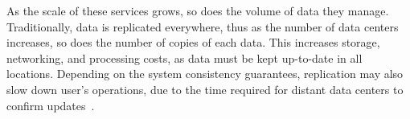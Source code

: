 
As the scale of these services grows, so does the volume of data they manage.
Traditionally, data is replicated everywhere, thus as the number of data centers increases, so does the number of copies of each data.
This increases storage, networking, and processing costs, as data must be kept up-to-date in all locations.
Depending on the system consistency guarantees, replication may also slow down user's operations, 
due to the time required for distant data centers to confirm updates~\cite{caerus,mdcc,detock}.




